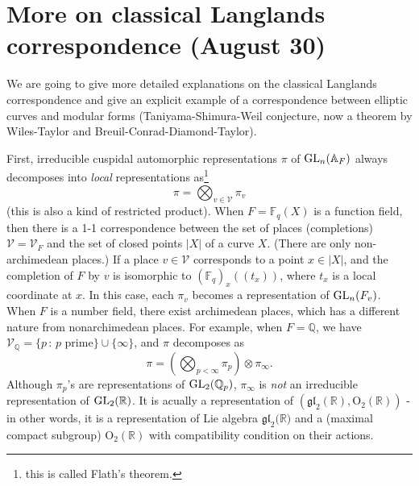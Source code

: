 \newpage
\section{More on classical Langlands correspondence (August 30)}

We are going to give more detailed explanations on the classical Langlands correspondence
and give an explicit example of a correspondence between elliptic curves and modular forms
(Taniyama-Shimura-Weil conjecture, now a theorem by Wiles-Taylor and Breuil-Conrad-Diamond-Taylor).

First, irreducible cuspidal automorphic representations $\pi$ of $\operatorname{\mathrm{GL}}_{n}(\mathbb{A}_{F})$
always decomposes into \emph{local} representations as\footnote{this is called Flath's theorem.}
$$
\pi = \bigotimes_{v \in \mathscr{V}}\pi_{v}
$$
(this is also a kind of restricted product).
When $F = \mathbb{F}_{q}(X)$ is a function field, then there is a 1-1 correspondence between
the set of places (completions) $\mathscr{V} = \mathscr{V}_{F}$ and the set of closed points $|X|$ of a curve $X$.
(There are only non-archimedean places.)
If a place $v \in \mathscr{V}$ corresponds to a point $x\in |X|$, and the completion of $F$
by $v$ is isomorphic to $(\mathbb{F}_{q})_{x}((t_{x}))$, where $t_{x}$ is a local coordinate at $x$.
In this case, each $\pi_{v}$ becomes a representation of $\operatorname{\mathrm{GL}}_{n}(F_{v})$.
When $F$ is a number field, there exist archimedean places, which has a different nature from nonarchimedean places.
For example, when $F = \mathbb{Q}$, we have $\mathscr{V}_{\mathbb{Q}} = \{p\,:\,p\text{ prime}\} \cup \{\infty\}$, and
$\pi$ decomposes as
$$
\pi = \left(\bigotimes_{p < \infty} \pi_{p}\right) \otimes \pi_{\infty}.
$$
Although $\pi_{p}$'s are representations of $\operatorname{\mathrm{GL}}_{2}(\mathbb{Q}_{p})$, $\pi_{\infty}$ is \emph{not} an
irreducible representation of $\operatorname{\mathrm{GL}}_{2}(\mathbb{R})$.
It is acually a representation of $(\mathfrak{gl}_{2}(\mathbb{R}), \mathrm{O}_{2}(\mathbb{R}))$ - in other words,
it is a representation of Lie algebra $\mathfrak{gl}_{2}(\mathbb{R)}$ and a (maximal compact subgroup) $\mathrm{O}_{2}(\mathbb{R})$
with compatibility condition on their actions.

